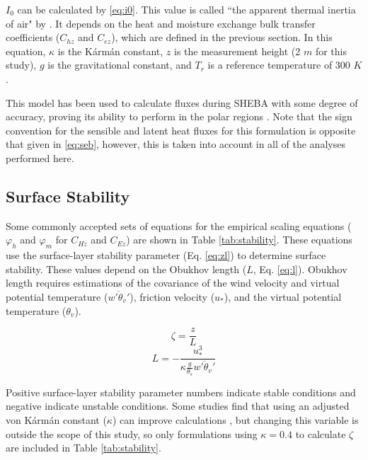 $I_{0}$ can be calculated by \ref{eq:i0}. This value is called ``the apparent thermal inertia of air" by \citet{wang:2009}. It depends on the heat and moisture exchange bulk transfer coefficients ($C_{hz}$ and $C_{ez}$), which are defined in the previous section. In this equation, $\kappa$ is the K\'{a}rm\'{a}n constant, $z$ is the measurement height (2 $m$ for this study), $g$ is the gravitational constant, and $T_{r}$ is a reference temperature of 300 $K$. 

This model has been used to calculate fluxes during SHEBA with some degree of accuracy, proving its ability to perform in the polar regions \citep{wang:2014}. Note that the sign convention for the sensible and latent heat fluxes for this formulation is opposite that given in \ref{eq:seb}, however, this is taken into account in all of the analyses performed here.

\subsection{Surface Stability}\label{surface:stability}
Some commonly accepted sets of equations for the empirical scaling equations ($\varphi_{h}$ and $\varphi_{m}$ for $C_{Hz}$ and $C_{Ez}$) are shown in Table \ref{tab:stability}. These equations use the surface-layer stability parameter (Eq. \ref{eq:zl}) to determine surface stability. These values depend on the Obukhov length ($L$, Eq. \ref{eq:l}). Obukhov length requires estimations of the covariance of the wind velocity and virtual potential temperature ($\overline{w'\theta_{v}'}$), friction velocity ($u_{*}$), and the virtual potential temperature ($\theta_{v}$). 

\begin{equation}\label{eq:zl}
\zeta = \frac{z}{L}
\end{equation}
\begin{equation}\label{eq:l}
L = -\frac{u_{*}^{3}}{\kappa \frac{g}{\theta_{s}} \overline{w'\theta_{v}'}}
\end{equation} 

Positive surface-layer stability parameter numbers indicate stable conditions and negative indicate unstable conditions. Some studies find that using an adjusted von K\'{a}rm\'{a}n constant ($\kappa$) can improve calculations \citep{businger:1971, zilitinkevitsch:1968, dyer:1970, foken:2008}, but changing this variable is outside the scope of this study, so only formulations using $\kappa = 0.4$ to calculate $\zeta$ are included in Table \ref{tab:stability}. 

